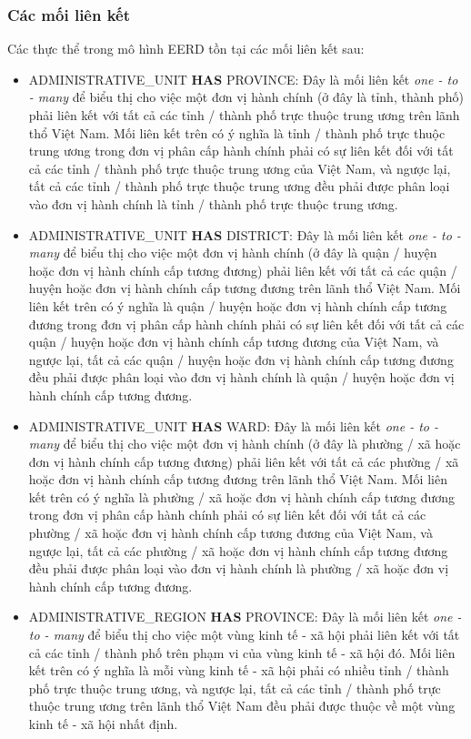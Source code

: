 \subsubsection{Các mối liên kết}
Các thực thể trong mô hình EERD tồn tại các mối liên kết sau:
\begin{itemize}
    \item ADMINISTRATIVE\_UNIT \textbf{HAS} PROVINCE: Đây là mối liên kết \textit{one - to - many} để biểu thị cho việc một đơn vị hành chính (ở đây là tỉnh, thành phố) phải liên kết với tất cả các tỉnh / thành phố trực thuộc trung ương trên lãnh thổ Việt Nam. Mối liên kết trên có ý nghĩa là tỉnh / thành phố trực thuộc trung ương trong đơn vị phân cấp hành chính phải có sự liên kết đối với tất cả các tỉnh / thành phố trực thuộc trung ương của Việt Nam, và ngược lại, tất cả các tỉnh / thành phố trực thuộc trung ương đều phải được phân loại vào đơn vị hành chính là tỉnh / thành phố trực thuộc trung ương.
    \item ADMINISTRATIVE\_UNIT \textbf{HAS} DISTRICT: Đây là mối liên kết \textit{one - to - many} để biểu thị cho việc một đơn vị hành chính (ở đây là quận / huyện hoặc đơn vị hành chính cấp tương đương) phải liên kết với tất cả các quận / huyện hoặc đơn vị hành chính cấp tương đương trên lãnh thổ Việt Nam. Mối liên kết trên có ý nghĩa là quận / huyện hoặc đơn vị hành chính cấp tương đương trong đơn vị phân cấp hành chính phải có sự liên kết đối với tất cả các quận / huyện hoặc đơn vị hành chính cấp tương đương của Việt Nam, và ngược lại, tất cả các quận / huyện hoặc đơn vị hành chính cấp tương đương đều phải được phân loại vào đơn vị hành chính là quận / huyện hoặc đơn vị hành chính cấp tương đương.
    \item ADMINISTRATIVE\_UNIT \textbf{HAS} WARD: Đây là mối liên kết \textit{one - to - many} để biểu thị cho việc một đơn vị hành chính (ở đây là phường / xã hoặc đơn vị hành chính cấp tương đương) phải liên kết với tất cả các phường / xã hoặc đơn vị hành chính cấp tương đương trên lãnh thổ Việt Nam. Mối liên kết trên có ý nghĩa là phường / xã hoặc đơn vị hành chính cấp tương đương trong đơn vị phân cấp hành chính phải có sự liên kết đối với tất cả các phường / xã hoặc đơn vị hành chính cấp tương đương của Việt Nam, và ngược lại, tất cả các phường / xã hoặc đơn vị hành chính cấp tương đương đều phải được phân loại vào đơn vị hành chính là phường / xã hoặc đơn vị hành chính cấp tương đương.
    \item ADMINISTRATIVE\_REGION \textbf{HAS} PROVINCE: Đây là mối liên kết \textit{one - to - many} để biểu thị cho việc một vùng kinh tế - xã hội phải liên kết với tất cả các tỉnh / thành phố trên phạm vi của vùng kinh tế - xã hội đó. Mối liên kết trên có ý nghĩa là mỗi vùng kinh tế - xã hội phải có nhiều tỉnh / thành phố trực thuộc trung ương, và ngược lại, tất cả các tỉnh / thành phố trực thuộc trung ương trên lãnh thổ Việt Nam đều phải được thuộc về một vùng kinh tế - xã hội nhất định.

\end{itemize}
